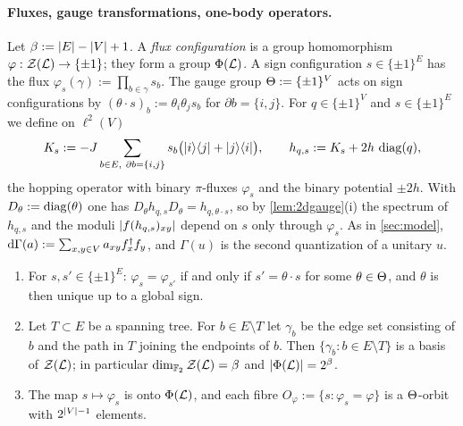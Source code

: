 \paragraph{Fluxes, gauge transformations, one-body operators.}
Let $\beta:=\left|E\right|-\left|V\right|+1$.  A \emph{flux configuration} is a group homomorphism
$\varphi:\mathcal{Z}(\mathcal{L})\to\{\pm1\}$; they form a group $\Phi(\mathcal{L})$.  A sign configuration
$s\in\{\pm1\}^E$ has the flux $\varphi_s(\gamma):=\prod_{b\in\gamma}s_b$.  The gauge group
$\Theta:=\{\pm1\}^V$ acts on sign configurations by $(\theta\cdot s)_b:=\theta_i\theta_js_b$ for
$\partial b=\{i,j\}$.  For $q\in\{\pm1\}^V$ and $s\in\{\pm1\}^E$ we define on $\ell^2(V)$
\begin{equation}\label{eq:hqs}
  K_s:=-J\sum_{b\in E,\ \partial b=\{i,j\}}s_b\bigl(|i\rangle\langle j|+|j\rangle\langle i|\bigr),\qquad
  h_{q,s}:=K_s+2h\,\operatorname{diag}(q),
\end{equation}
the hopping operator with binary $\pi$-fluxes $\varphi_s$ and the binary potential $\pm2h$.  With
$D_\theta:=\operatorname{diag}(\theta)$ one has $D_\theta h_{q,s}D_\theta=h_{q,\theta\cdot s}$, so by
\cref{lem:2dgauge}(i) the spectrum of $h_{q,s}$ and the moduli $\left|f(h_{q,s})_{xy}\right|$ depend on $s$ only
through $\varphi_s$.  As in \cref{sec:model}, $\mathrm{d}\Gamma(a):=\sum_{x,y\in V}a_{xy}f_x^\dagger f_y$, and
$\Gamma(u)$ is the second quantization of a unitary $u$.

\begin{lemma}\label{lem:2dgauge}
\leavevmode
\begin{enumerate}[label=(\roman*)]
\item For $s,s'\in\{\pm1\}^E$: $\varphi_s=\varphi_{s'}$ if and only if $s'=\theta\cdot s$ for some
$\theta\in\Theta$, and $\theta$ is then unique up to a global sign.
\item Let $T\subset E$ be a spanning tree.  For $b\in E\setminus T$ let $\gamma_b$ be the edge set
consisting of $b$ and the path in $T$ joining the endpoints of $b$.  Then
$\{\gamma_b:b\in E\setminus T\}$ is a basis of $\mathcal{Z}(\mathcal{L})$; in particular
$\dim_{\mathbb F_2}\mathcal{Z}(\mathcal{L})=\beta$ and $\left|\Phi(\mathcal{L})\right|=2^\beta$.
\item The map $s\mapsto\varphi_s$ is onto $\Phi(\mathcal{L})$, and each fibre
$O_\varphi:=\{s:\varphi_s=\varphi\}$ is a $\Theta$-orbit with $2^{\left|V\right|-1}$ elements.
\end{enumerate}
\end{lemma}

